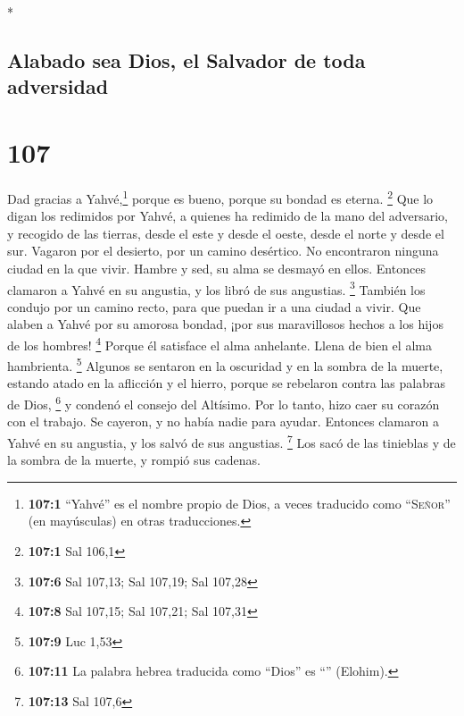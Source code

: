 \begin{paracol}{2}
\begin{otherlanguage}{english}
\end{otherlanguage}

\switchcolumn[0]*

\hypertarget{alabado-sea-dios-el-salvador-de-toda-adversidad}{%
\subsection{Alabado sea Dios, el Salvador de toda
adversidad}\label{alabado-sea-dios-el-salvador-de-toda-adversidad}}

\hypertarget{section-212}{%
\section{107}\label{section-212}}

 Dad gracias a Yahvé,\footnote{\textbf{107:1} ``Yahvé'' es
  el nombre propio de Dios, a veces traducido como ``\textsc{Señor}''
  (en mayúsculas) en otras traducciones.} porque es bueno, porque su
bondad es eterna. \footnote{\textbf{107:1} Sal 106,1}  Que
lo digan los redimidos por Yahvé, a quienes ha redimido de la mano del
adversario,  y recogido de las tierras, desde el este y
desde el oeste, desde el norte y desde el sur.  Vagaron
por el desierto, por un camino desértico. No encontraron ninguna ciudad
en la que vivir.  Hambre y sed, su alma se desmayó en
ellos.  Entonces clamaron a Yahvé en su angustia, y los
libró de sus angustias. \footnote{\textbf{107:6} Sal 107,13; Sal 107,19;
  Sal 107,28}  También los condujo por un camino recto,
para que puedan ir a una ciudad a vivir.  Que alaben a
Yahvé por su amorosa bondad, ¡por sus maravillosos hechos a los hijos de
los hombres! \footnote{\textbf{107:8} Sal 107,15; Sal 107,21; Sal 107,31}
 Porque él satisface el alma anhelante. Llena de bien el
alma hambrienta. \footnote{\textbf{107:9} Luc 1,53} 
Algunos se sentaron en la oscuridad y en la sombra de la muerte, estando
atado en la aflicción y el hierro,  porque se rebelaron
contra las palabras de Dios, \footnote{\textbf{107:11} La palabra hebrea
  traducida como ``Dios'' es ``'' (Elohim).} y condenó el
consejo del Altísimo.  Por lo tanto, hizo caer su corazón
con el trabajo. Se cayeron, y no había nadie para ayudar.
 Entonces clamaron a Yahvé en su angustia, y los salvó de
sus angustias. \footnote{\textbf{107:13} Sal 107,6}  Los
sacó de las tinieblas y de la sombra de la muerte, y rompió sus cadenas.

\end{paracol}
